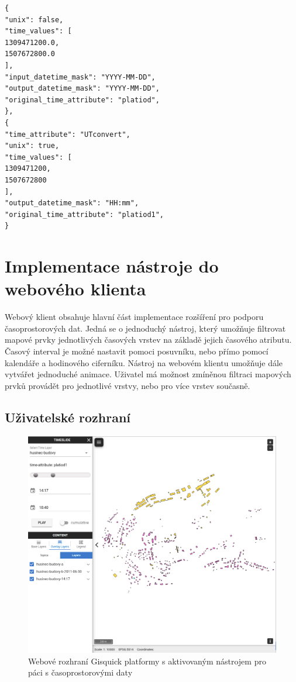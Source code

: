 \begin{verbatim}
{
"unix": false,
"time_values": [
1309471200.0,
1507672800.0
],
"input_datetime_mask": "YYYY-MM-DD",
"output_datetime_mask": "YYYY-MM-DD",
"original_time_attribute": "platiod",
},
{
"time_attribute": "UTconvert",
"unix": true,
"time_values": [
1309471200,
1507672800
],
"output_datetime_mask": "HH:mm",
"original_time_attribute": "platiod1",
}
\end{verbatim}

\newpage
\section{Implementace nástroje do webového klienta}
Webový klient obsahuje hlavní část implementace rozšíření pro podporu
časoprostorových dat. Jedná se o jednoduchý nástroj, který umožňuje
filtrovat mapové prvky jednotlivých časových vrstev na základě jejich
časového atributu. Časový interval je možné nastavit pomoci posuvníku,
nebo přímo pomocí kalendáře a hodinového ciferníku. Nástroj na
webovém klientu umožňuje dále vytvářet jednoduché animace. Uživatel
má možnost zmíněnou filtraci mapových prvků provádět pro jednotlivé
vrstvy, nebo pro více vrstev současně.

\subsection{Uživatelské rozhraní}
\label{sssec:gisquick-client-ui}

\begin{figure}[h!]
\centering
\includegraphics[width=1\textwidth]{../img/gisquick-time-tool.png}
\caption{Webové rozhraní Gisquick platformy s aktivovaným nástrojem
pro páci s časoprostorovými daty}
\label{fig:gisquick-client}
\end{figure}


